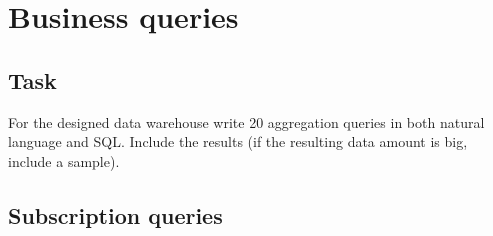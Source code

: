 \section{Business queries} %
\label{sub:Business queries}

\subsection*{Task} %
\label{sub:name}
For the designed data warehouse write 20 aggregation queries in both natural language and SQL. Include the results (if the resulting data amount is big, include a sample).

\subsection*{Subscription queries} %
\label{sub:Subscription business queries}

